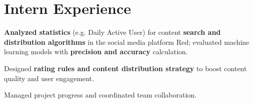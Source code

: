 
\section{\textbf{Intern Experience}}
\resumeSubHeadingListStart


\vspace{-1.0mm}

      \resumeItemListStart
        \item \textbf{Analyzed statistics} (e.g. Daily Active User) for content \textbf{search and distribution algorithms} in the social media platform Red; evaluated machine learning models with \textbf{precision and accuracy} calculation.
        \item Designed \textbf{rating rules and content distribution strategy} to boost content quality and user engagement.
        \item Managed project progress and coordinated team collaboration.
    \resumeItemListEnd
    \vspace{-3mm}

    

